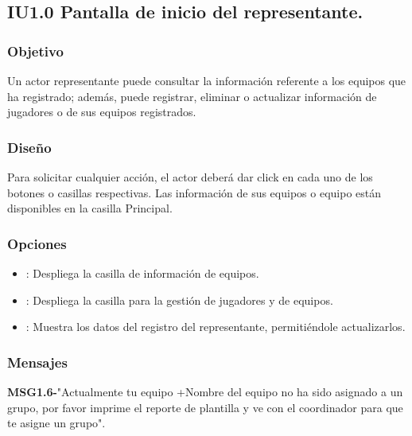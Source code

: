 
\subsection{IU1.0 Pantalla de inicio del representante.}

\subsubsection{Objetivo}
	Un actor representante puede consultar la información referente a los equipos que ha registrado; además, puede registrar, eliminar o actualizar información de jugadores o de sus equipos registrados.

\subsubsection{Diseño}
  Para solicitar cualquier acción, el actor deberá dar click en cada uno de los botones o casillas respectivas.
  Las información de sus equipos o equipo están disponibles en la casilla Principal.

\subsubsection{Opciones}
\begin{itemize}
	\item {}: Despliega la casilla de información de equipos.
  \item {}: Despliega la casilla para la gestión de jugadores y de equipos.
  \item {}: Muestra los datos del registro del representante, permitiéndole actualizarlos.
  
\end{itemize}
\subsubsection{Mensajes}
	\begin{Citemize}
		\item {\bf MSG1.6-}"Actualmente tu equipo +Nombre del equipo no ha sido asignado a un grupo, por favor imprime el reporte de plantilla y ve con el coordinador para que te asigne un grupo".
	\end{Citemize}
